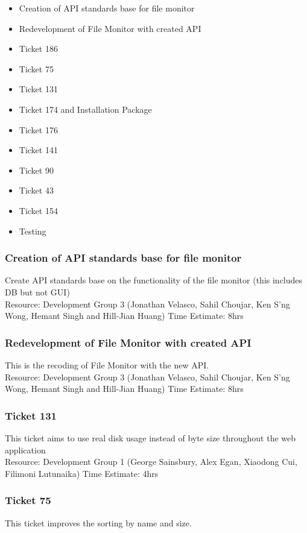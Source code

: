 \documentclass{article}
\begin{document}
\begin{itemize}
\item Creation of API standards base for file monitor
\item Redevelopment of File Monitor with created API
\item Ticket 186
\item Ticket 75
\item Ticket 131
\item Ticket 174 and Installation Package
\item Ticket 176
\item Ticket 141
\item Ticket 90
\item Ticket 43
\item Ticket 154
\item Testing
\end{itemize}

\subsubsection{Creation of API standards base for file monitor}
	Create API standards base on the functionality of the file monitor (this includes DB but not GUI)\\
	
	Resource: Development Group 3 (Jonathan Velasco, Sahil Choujar, Ken S'ng Wong, Hemant Singh and Hill-Jian Huang)
	Time Estimate: 8hrs

\subsubsection{Redevelopment of File Monitor with created API}
	This is the recoding of File Monitor with the new API.\\
	
	Resource: Development Group 3 (Jonathan Velasco, Sahil Choujar, Ken S'ng Wong, Hemant Singh and Hill-Jian Huang)
	Time Estimate: 8hrs

\subsubsection{Ticket 131}
	This ticket aims to use real disk usage instead of byte size throughout the web application\\
	
	Resource: Development Group 1 (George Sainsbury, Alex Egan, Xiaodong Cui, Filimoni Lutunaika)
	Time Estimate: 4hrs
	
\subsubsection{Ticket 75}
	This ticket improves the sorting by name and size.\\
	
\end{document}
